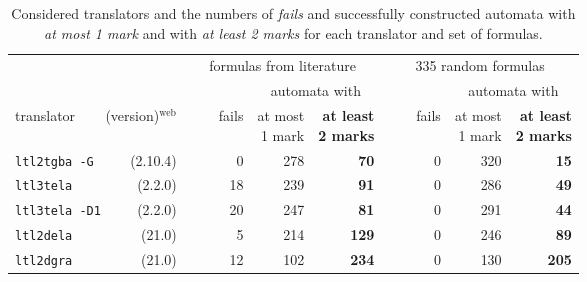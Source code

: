 \documentclass[a4paper,UKenglish,cleveref,autoref,thm-restate]{lipics-v2021}
\begin{document}
\begin{table}[t]
  \caption{Considered translators and the numbers of \emph{fails} and
    successfully constructed automata with \emph{at most 1 mark} and
    with \emph{at least 2 marks} for each translator and set of
    formulas.}
\label{tab:ltltranslators}
\centering
\setlength{\tabcolsep}{5.7pt}
\begin{tabular}{lrrrrrrr}
  \toprule
  && \multicolumn{3}{c}{\!348 formulas from literature\!} & \multicolumn{3}{c}{335 random formulas}\\
  \cmidrule(lr){3-5} \cmidrule(lr){6-8}
  &&& \multicolumn{2}{c}{automata with} && \multicolumn{2}{c}{automata with}\\
  \cmidrule(lr){4-5} \cmidrule(lr){7-8}
  \multicolumn{2}{l}{translator ~~~ (version)$^{\text{web}}$}
  & ~~~~fails & \makecell[r]{at most\\[-1ex] 1 mark} & \makecell[r]{\textbf{at least}\\[-1ex] \textbf{2 marks}}
  & ~~~~fails & \makecell[r]{at most\\[-1ex] 1 mark} & \makecell[r]{\textbf{at least}\\[-1ex] \textbf{2 marks}}\\
  \midrule 
  \texttt{ltl2tgba -G} & (2.10.4)\tablefootnote{\url{https://spot.lrde.epita.fr}}
  & 0 & 278 & \textbf{70} & 0 & 320 & \textbf{15}\\
  \texttt{ltl3tela} & (2.2.0)\tablefootnote{\url{https://github.com/jurajmajor/ltl3tela}}
  & 18 & 239 & \textbf{91} & 0 & 286 & \textbf{49}\\
  \texttt{ltl3tela -D1} & (2.2.0)\footnotemark[2]
  & 20 & 247 & \textbf{81} & 0 & 291 & \textbf{44}\\ 
  \texttt{ltl2dela} & (21.0)\tablefootnote{\label{fn:owl}\url{https://owl.model.in.tum.de/}}
  & 5 & 214 & \textbf{129} & 0 & 246 & \textbf{89}\\
  \texttt{ltl2dgra} & (21.0)\footnotemark[3]
  & 12 & 102 & \textbf{234} & 0 & 130 & \textbf{205}\\
  \bottomrule
\end{tabular}
\end{table}
\end{document}
